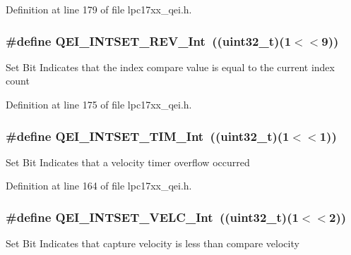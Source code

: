 \-Definition at line 179 of file lpc17xx\-\_\-qei.\-h.

\hypertarget{group___q_e_i___private___macros_gab47172d6876e34fc3cf229a137e875ca}{
\subsubsection[{\-Q\-E\-I\-\_\-\-I\-N\-T\-S\-E\-T\-\_\-\-R\-E\-V\-\_\-\-Int}]{\setlength{\rightskip}{0pt plus 5cm}\#define {\bf \-Q\-E\-I\-\_\-\-I\-N\-T\-S\-E\-T\-\_\-\-R\-E\-V\-\_\-\-Int}~((uint32\-\_\-t)(1$<$$<$9))}}\label{group___q_e_i___private___macros_gab47172d6876e34fc3cf229a137e875ca}
\-Set \-Bit \-Indicates that the index compare value is equal to the current index count 

\-Definition at line 175 of file lpc17xx\-\_\-qei.\-h.

\hypertarget{group___q_e_i___private___macros_ga06221a1884d6ec83167d29123b365001}{
\subsubsection[{\-Q\-E\-I\-\_\-\-I\-N\-T\-S\-E\-T\-\_\-\-T\-I\-M\-\_\-\-Int}]{\setlength{\rightskip}{0pt plus 5cm}\#define {\bf \-Q\-E\-I\-\_\-\-I\-N\-T\-S\-E\-T\-\_\-\-T\-I\-M\-\_\-\-Int}~((uint32\-\_\-t)(1$<$$<$1))}}\label{group___q_e_i___private___macros_ga06221a1884d6ec83167d29123b365001}
\-Set \-Bit \-Indicates that a velocity timer overflow occurred 

\-Definition at line 164 of file lpc17xx\-\_\-qei.\-h.

\hypertarget{group___q_e_i___private___macros_ga8602f95e032dc1e0fd639cf4e6a9efd3}{
\subsubsection[{\-Q\-E\-I\-\_\-\-I\-N\-T\-S\-E\-T\-\_\-\-V\-E\-L\-C\-\_\-\-Int}]{\setlength{\rightskip}{0pt plus 5cm}\#define {\bf \-Q\-E\-I\-\_\-\-I\-N\-T\-S\-E\-T\-\_\-\-V\-E\-L\-C\-\_\-\-Int}~((uint32\-\_\-t)(1$<$$<$2))}}\label{group___q_e_i___private___macros_ga8602f95e032dc1e0fd639cf4e6a9efd3}
\-Set \-Bit \-Indicates that capture velocity is less than compare velocity 

